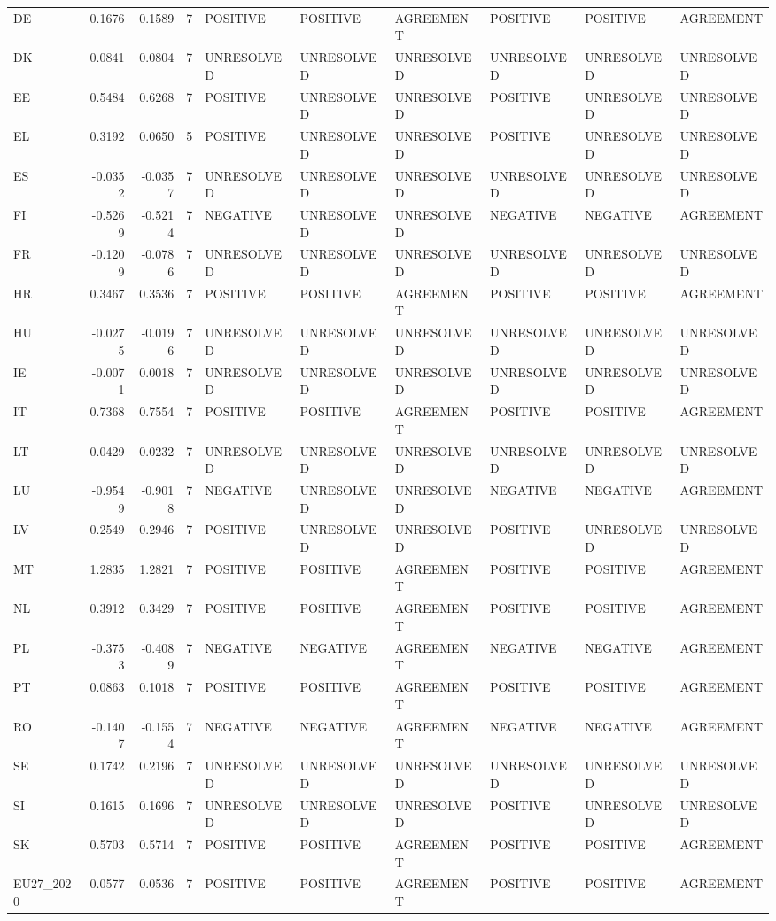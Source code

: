 \begin{longtable}{lrrrllllll}
DE & 0.1676 & 0.1589 & 7 & POSITIVE & POSITIVE & AGREEMENT & POSITIVE & POSITIVE & AGREEMENT \\
DK & 0.0841 & 0.0804 & 7 & UNRESOLVED & UNRESOLVED & UNRESOLVED & UNRESOLVED & UNRESOLVED & UNRESOLVED \\
EE & 0.5484 & 0.6268 & 7 & POSITIVE & UNRESOLVED & UNRESOLVED & POSITIVE & UNRESOLVED & UNRESOLVED \\
EL & 0.3192 & 0.0650 & 5 & POSITIVE & UNRESOLVED & UNRESOLVED & POSITIVE & UNRESOLVED & UNRESOLVED \\
ES & -0.0352 & -0.0357 & 7 & UNRESOLVED & UNRESOLVED & UNRESOLVED & UNRESOLVED & UNRESOLVED & UNRESOLVED \\
FI & -0.5269 & -0.5214 & 7 & NEGATIVE & UNRESOLVED & UNRESOLVED & NEGATIVE & NEGATIVE & AGREEMENT \\
FR & -0.1209 & -0.0786 & 7 & UNRESOLVED & UNRESOLVED & UNRESOLVED & UNRESOLVED & UNRESOLVED & UNRESOLVED \\
HR & 0.3467 & 0.3536 & 7 & POSITIVE & POSITIVE & AGREEMENT & POSITIVE & POSITIVE & AGREEMENT \\
HU & -0.0275 & -0.0196 & 7 & UNRESOLVED & UNRESOLVED & UNRESOLVED & UNRESOLVED & UNRESOLVED & UNRESOLVED \\
IE & -0.0071 & 0.0018 & 7 & UNRESOLVED & UNRESOLVED & UNRESOLVED & UNRESOLVED & UNRESOLVED & UNRESOLVED \\
IT & 0.7368 & 0.7554 & 7 & POSITIVE & POSITIVE & AGREEMENT & POSITIVE & POSITIVE & AGREEMENT \\
LT & 0.0429 & 0.0232 & 7 & UNRESOLVED & UNRESOLVED & UNRESOLVED & UNRESOLVED & UNRESOLVED & UNRESOLVED \\
LU & -0.9549 & -0.9018 & 7 & NEGATIVE & UNRESOLVED & UNRESOLVED & NEGATIVE & NEGATIVE & AGREEMENT \\
LV & 0.2549 & 0.2946 & 7 & POSITIVE & UNRESOLVED & UNRESOLVED & POSITIVE & UNRESOLVED & UNRESOLVED \\
MT & 1.2835 & 1.2821 & 7 & POSITIVE & POSITIVE & AGREEMENT & POSITIVE & POSITIVE & AGREEMENT \\
NL & 0.3912 & 0.3429 & 7 & POSITIVE & POSITIVE & AGREEMENT & POSITIVE & POSITIVE & AGREEMENT \\
PL & -0.3753 & -0.4089 & 7 & NEGATIVE & NEGATIVE & AGREEMENT & NEGATIVE & NEGATIVE & AGREEMENT \\
PT & 0.0863 & 0.1018 & 7 & POSITIVE & POSITIVE & AGREEMENT & POSITIVE & POSITIVE & AGREEMENT \\
RO & -0.1407 & -0.1554 & 7 & NEGATIVE & NEGATIVE & AGREEMENT & NEGATIVE & NEGATIVE & AGREEMENT \\
SE & 0.1742 & 0.2196 & 7 & UNRESOLVED & UNRESOLVED & UNRESOLVED & UNRESOLVED & UNRESOLVED & UNRESOLVED \\
SI & 0.1615 & 0.1696 & 7 & UNRESOLVED & UNRESOLVED & UNRESOLVED & POSITIVE & UNRESOLVED & UNRESOLVED \\
SK & 0.5703 & 0.5714 & 7 & POSITIVE & POSITIVE & AGREEMENT & POSITIVE & POSITIVE & AGREEMENT \\
EU27\_2020 & 0.0577 & 0.0536 & 7 & POSITIVE & POSITIVE & AGREEMENT & POSITIVE & POSITIVE & AGREEMENT \\
\end{longtable}

\endgroup
